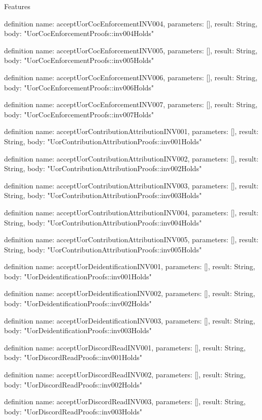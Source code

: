 \begin{lexlean}{Features}
\begin{semanticmodule}
definition{
  name: acceptUorCocEnforcementINV004,
  parameters: [],
  result: String,
  body: "UorCocEnforcementProofs::inv004Holds"
}

definition{
  name: acceptUorCocEnforcementINV005,
  parameters: [],
  result: String,
  body: "UorCocEnforcementProofs::inv005Holds"
}

definition{
  name: acceptUorCocEnforcementINV006,
  parameters: [],
  result: String,
  body: "UorCocEnforcementProofs::inv006Holds"
}

definition{
  name: acceptUorCocEnforcementINV007,
  parameters: [],
  result: String,
  body: "UorCocEnforcementProofs::inv007Holds"
}

definition{
  name: acceptUorContributionAttributionINV001,
  parameters: [],
  result: String,
  body: "UorContributionAttributionProofs::inv001Holds"
}

definition{
  name: acceptUorContributionAttributionINV002,
  parameters: [],
  result: String,
  body: "UorContributionAttributionProofs::inv002Holds"
}

definition{
  name: acceptUorContributionAttributionINV003,
  parameters: [],
  result: String,
  body: "UorContributionAttributionProofs::inv003Holds"
}

definition{
  name: acceptUorContributionAttributionINV004,
  parameters: [],
  result: String,
  body: "UorContributionAttributionProofs::inv004Holds"
}

definition{
  name: acceptUorContributionAttributionINV005,
  parameters: [],
  result: String,
  body: "UorContributionAttributionProofs::inv005Holds"
}

definition{
  name: acceptUorDeidentificationINV001,
  parameters: [],
  result: String,
  body: "UorDeidentificationProofs::inv001Holds"
}

definition{
  name: acceptUorDeidentificationINV002,
  parameters: [],
  result: String,
  body: "UorDeidentificationProofs::inv002Holds"
}

definition{
  name: acceptUorDeidentificationINV003,
  parameters: [],
  result: String,
  body: "UorDeidentificationProofs::inv003Holds"
}

definition{
  name: acceptUorDiscordReadINV001,
  parameters: [],
  result: String,
  body: "UorDiscordReadProofs::inv001Holds"
}

definition{
  name: acceptUorDiscordReadINV002,
  parameters: [],
  result: String,
  body: "UorDiscordReadProofs::inv002Holds"
}

definition{
  name: acceptUorDiscordReadINV003,
  parameters: [],
  result: String,
  body: "UorDiscordReadProofs::inv003Holds"
}


\end{semanticmodule}
\end{lexlean}
